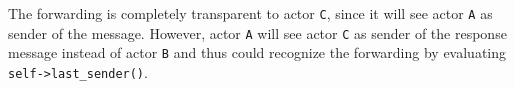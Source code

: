 The forwarding is completely transparent to actor \texttt{C}, since it will see actor \texttt{A} as sender of the message.
However, actor \texttt{A} will see actor \texttt{C} as sender of the response message instead of actor \texttt{B} and thus could recognize the forwarding by evaluating \lstinline^self->last_sender()^.